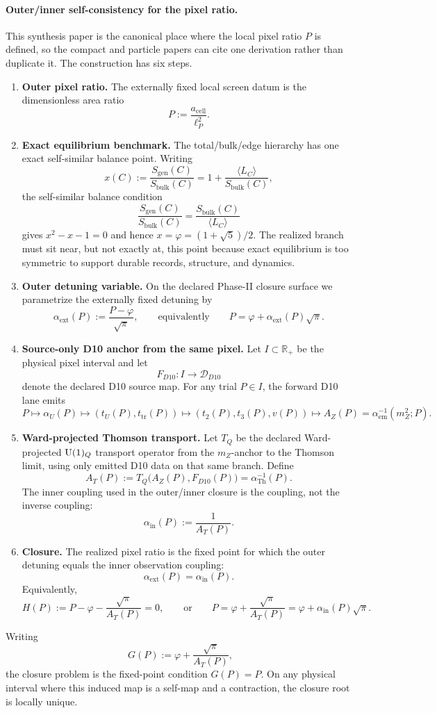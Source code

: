 \paragraph{Outer/inner self-consistency for the pixel ratio.}\label{sec:p-closure}
This synthesis paper is the canonical place where the local pixel ratio \(P\) is defined, so the
compact and particle papers can cite one derivation rather than duplicate it. The construction has
six steps.
\begin{enumerate}[leftmargin=2em]
\item \textbf{Outer pixel ratio.} The externally fixed local screen datum is the dimensionless area
ratio
\[
P:=\frac{a_{\mathrm{cell}}}{\ell_P^2}.
\]
\item \textbf{Exact equilibrium benchmark.} The total/bulk/edge hierarchy has one exact
self-similar balance point. Writing
\[
x(C):=\frac{S_{\mathrm{gen}}(C)}{S_{\mathrm{bulk}}(C)}
=
1+\frac{\langle L_C\rangle}{S_{\mathrm{bulk}}(C)},
\]
the self-similar balance condition
\[
\frac{S_{\mathrm{gen}}(C)}{S_{\mathrm{bulk}}(C)}
=
\frac{S_{\mathrm{bulk}}(C)}{\langle L_C\rangle}
\]
gives \(x^2-x-1=0\) and hence \(x=\varphi=(1+\sqrt5)/2\). The realized branch must sit near, but
not exactly at, this point because exact equilibrium is too symmetric to support durable records,
structure, and dynamics.
\item \textbf{Outer detuning variable.} On the declared Phase-II closure surface we parametrize
the externally fixed detuning by
\[
\alpha_{\mathrm{ext}}(P):=\frac{P-\varphi}{\sqrt{\pi}},
\qquad\text{equivalently}\qquad
P=\varphi+\alpha_{\mathrm{ext}}(P)\sqrt{\pi}.
\]
\item \textbf{Source-only D10 anchor from the same pixel.} Let \(I\subset\mathbb R_+\) be the
physical pixel interval and let
\[
F_{D10}:I\longrightarrow\mathcal D_{D10}
\]
denote the declared D10 source map. For any trial \(P\in I\), the forward D10 lane emits
\[
P\longmapsto \alpha_U(P)\longmapsto (t_U(P),t_{\mathrm{tr}}(P))
\longmapsto (t_2(P),t_3(P),v(P))
\longmapsto A_Z(P)=\alpha_{\mathrm{em}}^{-1}(m_Z^2;P).
\]
\item \textbf{Ward-projected Thomson transport.} Let \(T_Q\) be the declared Ward-projected
\(\mathrm{U}(1)_Q\) transport operator from the \(m_Z\)-anchor to the Thomson limit, using only emitted
D10 data on that same branch. Define
\[
A_T(P):=
T_Q\bigl(A_Z(P),F_{D10}(P)\bigr)
=
\alpha_{\mathrm{Th}}^{-1}(P).
\]
The inner coupling used in the outer/inner closure is the coupling, not the inverse coupling:
\[
\alpha_{\mathrm{in}}(P):=\frac{1}{A_T(P)}.
\]
\item \textbf{Closure.} The realized pixel ratio is the fixed point for which the outer detuning
equals the inner observation coupling:
\[
\alpha_{\mathrm{ext}}(P)=\alpha_{\mathrm{in}}(P).
\]
Equivalently,
\[
H(P):=P-\varphi-\frac{\sqrt{\pi}}{A_T(P)}=0,
\qquad\text{or}\qquad
P=\varphi+\frac{\sqrt{\pi}}{A_T(P)}=\varphi+\alpha_{\mathrm{in}}(P)\sqrt{\pi}.
\]
\end{enumerate}
Writing
\[
G(P):=\varphi+\frac{\sqrt{\pi}}{A_T(P)},
\]
the closure problem is the fixed-point condition \(G(P)=P\).
On any physical interval where this induced map is a self-map and a contraction, the closure root
is locally unique.


